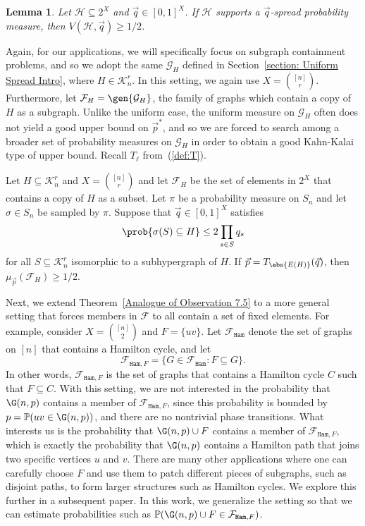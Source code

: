 \documentclass[12pt]{article}
\newtheorem{lemma}[theorem]{Lemma}
\def\pr{{\mathbb P}}
\begin{document}
\begin{lemma}
\label{lemma: Analogue of Observation 7.4}
Let $\mathcal{H}\subseteq 2^X$ and $\vec{q}\in [0,1]^X$. If $\mathcal{H}$ supports a $\vec{q}$-spread probability measure, then $V(\mathcal{H}, \vec{q})\geq 1/2$.
\end{lemma}

Again, for our applications, we will specifically focus on subgraph containment problems, and so we adopt the same $\mathcal{G}_H$ defined in Section~\ref{section: Uniform Spread Intro}, where $H\in\mathcal{K}_n^r$. In this setting, we again use $X = \binom{[n]}{r}$. Furthermore, let $\mathcal{F}_H = \gen{\mathcal{G}_H}$, the family of graphs which contain a copy of $H$ as a subgraph. Unlike the uniform case, the uniform measure on $\mathcal{G}_H$ often does not yield a good upper bound on $\vec{p}^*$, and so we are forced to search among a broader set of probability measures on $\mathcal{G}_H$ in order to obtain a good Kahn-Kalai type of upper bound. Recall $T_{\ell}$ from~(\ref{def:T}). 

\begin{theorem}
\label{Analogue of Observation 7.5}
Let $H\subseteq\mathcal{K}_n^r$ and $X = \binom{[n]}{r}$ and let $\mathcal{F}_H$  be the set of elements in $2^X$ that contains a copy of $H$ as a subset. Let $\pi$ be a probability measure on $S_n$ and let $\sigma\in S_n$ be sampled by $\pi$. Suppose that $\vec{q}\in [0,1]^X$ satisfies
\[
    \prob{\sigma(S)\subseteq H}\leq 2\displaystyle\prod\limits_{s\in S} q_s
\]
for all $S\subseteq\mathcal{K}_n^r$ isomorphic to a subhypergraph of $H$. If $\vec{p} = T_{\abs{E(H)}}(\vec{q})$, then $\mu_{\vec{p}}\left(\mathcal{F}_H\right)\geq 1/2$.
\end{theorem}



Next, we extend Theorem~\ref{Analogue of Observation 7.5} to a more general setting that forces members in $\mathcal{F}$ to all contain a set of fixed elements. 
For example, consider $X=\binom{[n]}{2}$ and $F=\{uv\}$. Let $\mathcal{F}_{\texttt{Ham}}$ denote the set of graphs on $[n]$ that contains a Hamilton cycle, and let 
\[
\mathcal{F}_{\texttt{Ham},F}=\{G\in \mathcal{F}_{\texttt{Ham}}: F\subseteq G\}.
\]
In other words, $\mathcal{F}_{\texttt{Ham},F}$ is the set of graphs that contains a Hamilton cycle $C$ such that $F\subseteq C$. With this setting, we are not interested in the probability that $\G(n,p)$ contains a member of $\mathcal{F}_{\texttt{Ham},F}$, since this probability is bounded by $p=\pr(uv\in \G(n,p))$, and there are no nontrivial phase transitions. What interests us is the probability that $\G(n,p)\cup F$ contains a member of $\mathcal{F}_{\texttt{Ham},F}$, which is exactly the probability that $\G(n,p)$ contains a Hamilton path that joins two specific vertices $u$ and $v$. There are many other applications where one can carefully choose $F$ and use them to patch different pieces of subgraphs, such as disjoint paths, to form larger structures such as Hamilton cycles. We explore this further in a subsequent paper. In this work, we generalize the setting so that we can estimate probabilities such as $\pr(\G(n,p)\cup F\in  \mathcal{F}_{\texttt{Ham},F})$.
\end{document}
